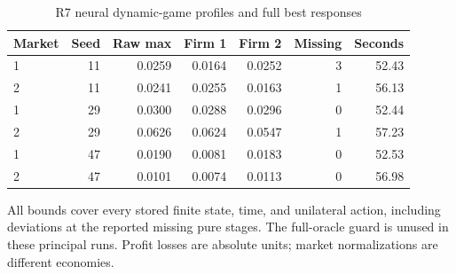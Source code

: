 \begin{table}[htbp]\centering
\caption{R7 neural dynamic-game profiles and full best responses}
\begin{small}\begin{tabular}{lrrrrrr}
\toprule
Market & Seed & Raw max & Firm 1 & Firm 2 & Missing & Seconds \\
\midrule
1 & 11 & 0.0259 & 0.0164 & 0.0252 & 3 & 52.43 \\
2 & 11 & 0.0241 & 0.0255 & 0.0163 & 1 & 56.13 \\
1 & 29 & 0.0300 & 0.0288 & 0.0296 & 0 & 52.44 \\
2 & 29 & 0.0626 & 0.0624 & 0.0547 & 1 & 57.23 \\
1 & 47 & 0.0190 & 0.0081 & 0.0183 & 0 & 52.53 \\
2 & 47 & 0.0101 & 0.0074 & 0.0113 & 0 & 56.98 \\
\bottomrule\end{tabular}\end{small}
\par\smallskip\begin{minipage}{.96\linewidth}\footnotesize All bounds cover every stored finite state, time, and unilateral action, including deviations at the reported missing pure stages. The full-oracle guard is unused in these principal runs. Profit losses are absolute units; market normalizations are different economies.\end{minipage}
\end{table}
